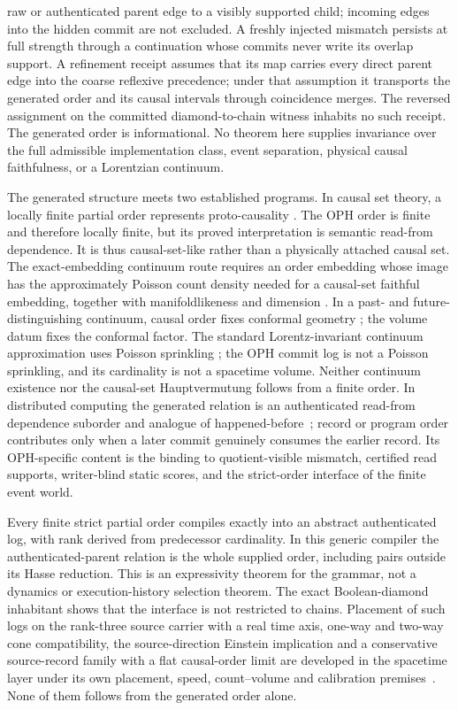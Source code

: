 \documentclass[11pt]{article}
\theoremstyle{remark}
\theoremstyle{plain}
\begin{document}
raw or authenticated parent edge to a visibly supported child; incoming edges
into the hidden commit are not excluded. A freshly injected mismatch persists at full
strength through a continuation whose commits never write its overlap
support. A refinement receipt assumes that its map carries every direct
parent edge into the coarse reflexive precedence; under that assumption it
transports the generated order and its causal intervals through coincidence
merges. The reversed assignment on the committed diamond-to-chain witness
inhabits no such receipt. The generated order is informational. No theorem
here supplies invariance over the full admissible implementation class,
event separation, physical causal faithfulness, or a Lorentzian continuum.

The generated structure meets two established programs. In causal set theory,
a locally finite partial order represents proto-causality
\cite{bombelli1987,surya2019}. The OPH order is finite and therefore locally
finite, but its proved interpretation is semantic read-from dependence. It is
thus causal-set-like rather than a physically attached causal set. The
exact-embedding continuum route requires an order embedding whose image has the approximately
Poisson count density needed for a causal-set faithful embedding, together
with manifoldlikeness and dimension
\cite{bombellimeyer1989,brightwellgregory1991,majorrideoutsurya2007}. In a
past- and future-distinguishing continuum, causal order fixes conformal
geometry \cite{hawkingkingmccarthy1976,malament1977}; the volume datum fixes
the conformal factor. The standard Lorentz-invariant continuum approximation
uses Poisson sprinkling \cite{bombellihensonsorkin2009}; the OPH commit log is
not a Poisson sprinkling, and its cardinality is not a spacetime volume.
Neither continuum existence nor the causal-set Hauptvermutung follows from a
finite order. In distributed computing the generated relation is an
authenticated read-from dependence suborder and analogue of
happened-before~\cite{lamport1978}; record or program order contributes only
when a later commit genuinely consumes the earlier record. Its OPH-specific content is the binding to
quotient-visible mismatch, certified read supports, writer-blind static
scores, and the strict-order interface of the finite event world.

Every finite strict partial order compiles exactly into an abstract
authenticated log, with rank derived from predecessor cardinality. In this
generic compiler the authenticated-parent relation is the whole supplied
order, including pairs outside its Hasse reduction. This is an expressivity theorem for
the grammar, not a dynamics or execution-history selection theorem. The
exact Boolean-diamond inhabitant shows that the interface is not
restricted to chains. Placement of such logs on the rank-three source
carrier with a real time axis, one-way and two-way cone compatibility, the
source-direction Einstein implication and a conservative source-record
family with a flat causal-order limit are developed in the spacetime layer
under its own placement, speed, count--volume and calibration
premises~\cite{ophEinstein}. None of them follows from the generated order
alone.
\end{document}

